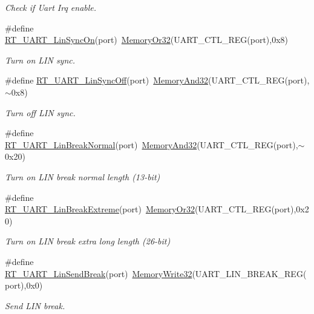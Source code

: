 \begin{DoxyCompactItemize}
\begin{DoxyCompactList}\small\item\em Check if Uart Irq enable. \end{DoxyCompactList}\item 
\#define \mbox{\hyperlink{a00098_a49f9d43f5fd87ceed952123010e015fa}{R\+T\+\_\+\+U\+A\+R\+T\+\_\+\+Lin\+Sync\+On}}(port)~\mbox{\hyperlink{a00026_a27874a97deab7cecdde5ddecf466e31e}{Memory\+Or32}}(U\+A\+R\+T\+\_\+\+C\+T\+L\+\_\+\+R\+EG(port),0x8)
\begin{DoxyCompactList}\small\item\em Turn on L\+IN sync. \end{DoxyCompactList}\item 
\#define \mbox{\hyperlink{a00098_aea01869278bc3c4e332af854c4e660be}{R\+T\+\_\+\+U\+A\+R\+T\+\_\+\+Lin\+Sync\+Off}}(port)~\mbox{\hyperlink{a00026_ad87cedffcaadc51db22594fce55173d4}{Memory\+And32}}(U\+A\+R\+T\+\_\+\+C\+T\+L\+\_\+\+R\+EG(port),$\sim$0x8)
\begin{DoxyCompactList}\small\item\em Turn off L\+IN sync. \end{DoxyCompactList}\item 
\#define \mbox{\hyperlink{a00098_a45d1e1116c5b535f276acc73e522570f}{R\+T\+\_\+\+U\+A\+R\+T\+\_\+\+Lin\+Break\+Normal}}(port)~\mbox{\hyperlink{a00026_ad87cedffcaadc51db22594fce55173d4}{Memory\+And32}}(U\+A\+R\+T\+\_\+\+C\+T\+L\+\_\+\+R\+EG(port),$\sim$0x20)
\begin{DoxyCompactList}\small\item\em Turn on L\+IN break normal length (13-\/bit) \end{DoxyCompactList}\item 
\#define \mbox{\hyperlink{a00098_a9e7d98206f07485a3347bab6672a971c}{R\+T\+\_\+\+U\+A\+R\+T\+\_\+\+Lin\+Break\+Extreme}}(port)~\mbox{\hyperlink{a00026_a27874a97deab7cecdde5ddecf466e31e}{Memory\+Or32}}(U\+A\+R\+T\+\_\+\+C\+T\+L\+\_\+\+R\+EG(port),0x20)
\begin{DoxyCompactList}\small\item\em Turn on L\+IN break extra long length (26-\/bit) \end{DoxyCompactList}\item 
\#define \mbox{\hyperlink{a00098_ad1e6c13693e5ea54a55ce78635617178}{R\+T\+\_\+\+U\+A\+R\+T\+\_\+\+Lin\+Send\+Break}}(port)~\mbox{\hyperlink{a00026_a6b9732365b12e48ddb89fe1028b975b0}{Memory\+Write32}}(U\+A\+R\+T\+\_\+\+L\+I\+N\+\_\+\+B\+R\+E\+A\+K\+\_\+\+R\+EG(port),0x0)
\begin{DoxyCompactList}\small\item\em Send L\+IN break. \end{DoxyCompactList}\item 

\end{DoxyCompactItemize}
